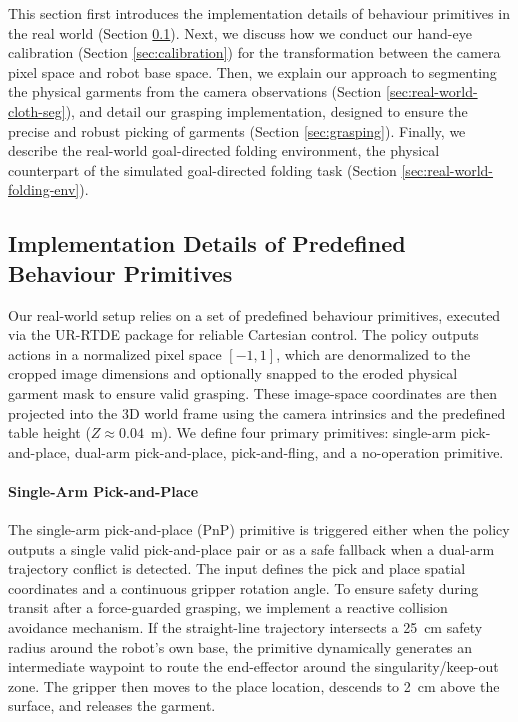 \documentclass[journal]{IEEEtran}
\begin{document}
This section first introduces the implementation details of behaviour primitives in the real world (Section \ref{sec:real-world-primitives}). Next, we discuss how we conduct our hand-eye calibration (Section \ref{sec:calibration}) for the transformation between the camera pixel space and robot base space. Then, we explain our approach to segmenting the physical garments from the camera observations (Section \ref{sec:real-world-cloth-seg}), and detail our grasping implementation, designed to ensure the precise and robust picking of garments (Section \ref{sec:grasping}). Finally, we describe the real-world goal-directed folding environment, the physical counterpart of the simulated goal-directed folding task (Section \ref{sec:real-world-folding-env}).

\subsection{Implementation Details of Predefined Behaviour Primitives} \label{sec:real-world-primitives}

Our real-world setup relies on a set of predefined behaviour primitives, executed via the UR-RTDE package for reliable Cartesian control. The policy outputs actions in a normalized pixel space $[-1, 1]$, which are denormalized to the cropped image dimensions and optionally snapped to the eroded physical garment mask to ensure valid grasping. These image-space coordinates are then projected into the 3D world frame using the camera intrinsics and the predefined table height ($Z \approx 0.04$~m). We define four primary primitives: single-arm pick-and-place, dual-arm pick-and-place, pick-and-fling, and a no-operation primitive.

\paragraph{Single-Arm Pick-and-Place} The single-arm pick-and-place (PnP) primitive is triggered either when the policy outputs a single valid pick-and-place pair or as a safe fallback when a dual-arm trajectory conflict is detected. The input defines the pick and place spatial coordinates and a continuous gripper rotation angle. To ensure safety during transit after a force-guarded grasping, we implement a reactive collision avoidance mechanism. If the straight-line trajectory intersects a 25~cm safety radius around the robot's own base, the primitive dynamically generates an intermediate waypoint to route the end-effector around the singularity/keep-out zone. The gripper then moves to the place location, descends to 2~cm above the surface, and releases the garment.
\end{document}
